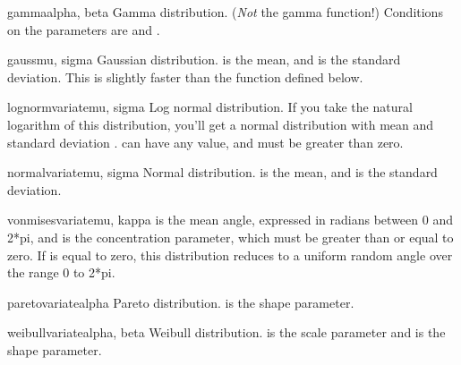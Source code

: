 \begin{funcdesc}{gamma}{alpha, beta}
Gamma distribution.  (\emph{Not} the gamma function!)  Conditions on
the parameters are  and .
\end{funcdesc}

\begin{funcdesc}{gauss}{mu, sigma}
Gaussian distribution.   is the mean, and  is the
standard deviation.  This is slightly faster than the
 function defined below.
\end{funcdesc}

\begin{funcdesc}{lognormvariate}{mu, sigma}
Log normal distribution.  If you take the natural logarithm of this
distribution, you'll get a normal distribution with mean  and
standard deviation .   can have any value, and 
must be greater than zero.  
\end{funcdesc}

\begin{funcdesc}{normalvariate}{mu, sigma}
Normal distribution.   is the mean, and  is the
standard deviation.
\end{funcdesc}

\begin{funcdesc}{vonmisesvariate}{mu, kappa}
 is the mean angle, expressed in radians between 0 and 2*pi,
and  is the concentration parameter, which must be greater
than or equal to zero.  If  is equal to zero, this
distribution reduces to a uniform random angle over the range 0 to
2*pi.
\end{funcdesc}

\begin{funcdesc}{paretovariate}{alpha}
Pareto distribution.   is the shape parameter.
\end{funcdesc}

\begin{funcdesc}{weibullvariate}{alpha, beta}
Weibull distribution.   is the scale parameter and
 is the shape parameter.
\end{funcdesc}

\begin{seealso}
\end{seealso}
